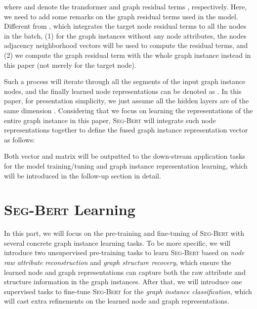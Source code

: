 \documentclass{article}
\newcommand{\our}{\textsc{Seg-Bert}}
\begin{document}
where  and  denote the transformer \cite{Vaswani_Attention_17} and graph residual terms \cite{zhang2019gresnet}, respectively. Here, we need to add some remarks on the graph residual terms used in the model. Different from \cite{zhang2020graph}, which integrates the target node residual terms to all the nodes in the batch, (1) for the graph instances without any node attributes, the nodes adjacency neighborhood vectors will be used to compute the residual terms, and (2) we compute the graph residual term with the whole graph instance instead in this paper (not merely for the target node).

Such a process will iterate through all the segments of the input graph instance nodes, and the finally learned node representations can be denoted as . In this paper, for presentation simplicity, we just assume all the hidden layers are of the same dimension . Considering that we focus on learning the representations of the entire graph instance in this paper, {\our} will integrate such node representations together to define the fused graph instance representation vector as follows:\vspace{-5pt}

Both vector  and matrix  will be outputted to the down-stream application tasks for the model training/tuning and graph instance representation learning, which will be introduced in the follow-up section in detail.











\section{{\our} Learning}\label{sec:analysis}

In this part, we will focus on the pre-training and fine-tuning of {\our} with several concrete graph instance learning tasks. To be more specific, we will introduce two unsupervised pre-training tasks to learn {\our} based on \textit{node raw attribute reconstruction} and \textit{graph structure recovery}, which ensure the learned node and graph representations can capture both the raw attribute and structure information in the graph instances. After that, we will introduce one supervised tasks to fine-tune {\our} for the \textit{graph instance classification}, which will cast extra refinements on the learned node and graph representations.
\end{document}
